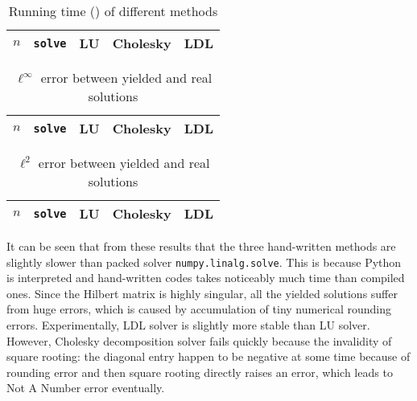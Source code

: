 \documentclass[english, nochinese]{pnote}
\begin{document}
\begin{table}[htb]
\centering
\begin{tabular}{|c|c|c|c|c|}
\hline
$n$ & \verb"solve" & LU & Cholesky & LDL \\
\hline

\end{tabular}
\caption{Running time () of different methods}
\label{Tbl:Time}
\end{table}

\begin{table}[htb]
\centering
\begin{tabular}{|c|c|c|c|c|}
\hline
$n$ & \verb"solve" & LU & Cholesky & LDL \\
\hline

\end{tabular}
\caption{$\ell^{\infty}$ error between yielded and real solutions}
\label{Tbl:ErrInfty}
\end{table}

\begin{table}[htb]
\centering
\begin{tabular}{|c|c|c|c|c|}
\hline
$n$ & \verb"solve" & LU & Cholesky & LDL \\
\hline

\end{tabular}
\caption{$\ell^2$ error between yielded and real solutions}
\label{Tbl:Err2}
\end{table}

It can be seen that from these results that the three hand-written methods are slightly slower than packed solver \verb"numpy.linalg.solve". This is because Python is interpreted and hand-written codes takes noticeably much time than compiled ones. Since the Hilbert matrix is highly singular, all the yielded solutions suffer from huge errors, which is caused by accumulation of tiny numerical rounding errors. Experimentally, LDL solver is slightly more stable than LU solver. However, Cholesky decomposition solver fails quickly because the invalidity of square rooting: the diagonal entry happen to be negative at some time because of rounding error and then square rooting directly raises an error, which leads to Not A Number error eventually.
\end{document}
